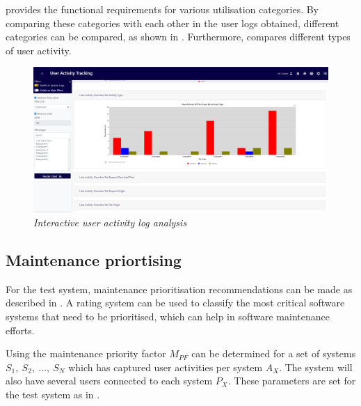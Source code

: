 \clearpage

 provides the functional requirements for various utilisation categories. By comparing these categories with each other in the user logs obtained, different categories can be compared, as shown in . Furthermore,  compares different types of user activity.

\begin{figure}[!htb]
	\centering %
	\includegraphics[width=0.99\linewidth]{img/ch3/analysis/UAT_menu_activities.png}
	\caption[Interactive user activity log analysis]
	{\textit{Interactive user activity log analysis}}\label{fig:ch3_UAT_menuActivities}
\end{figure}

\subsection{Maintenance priortising}
For the test system, maintenance prioritisation recommendations can be made as described in . A rating system can be used to classify the most critical software systems that need to be prioritised, which can help in software maintenance efforts.\par Using  the maintenance priority factor $M_{PF}$ can be determined for a set of systems {$S_1,~S_2,~...,~S_N$} which has captured user activities per system $A_X$. The system will also have several users connected to each system $P_X$. These parameters are set for the test system as in .

